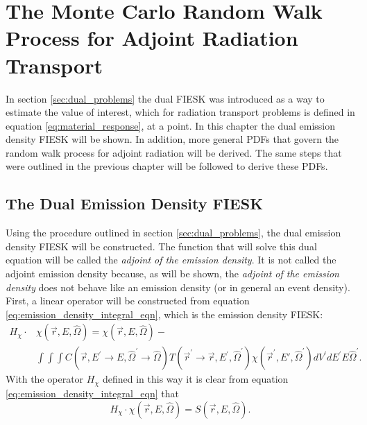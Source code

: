 \chapter{The Monte Carlo Random Walk Process for Adjoint Radiation Transport}
\label{ch:adjoint_particle_transport}
In section \ref{sec:dual_problems} the dual FIESK was introduced as a way to
estimate the value of interest, which for radiation transport problems is
defined in equation \ref{eq:material_response}, at a point. In this chapter the 
dual emission density FIESK will be shown. In addition, more general PDFs that 
govern the random walk process for adjoint radiation will be derived. The same 
steps that were outlined in the previous chapter will be followed to derive 
these PDFs.  

\section{The Dual Emission Density FIESK}
Using the procedure outlined in section \ref{sec:dual_problems}, the dual 
emission density FIESK will be constructed. The function that will solve this 
dual equation will be called the \textit{adjoint of the emission density}. It 
is not called the adjoint emission density because, as will be shown, the
\textit{adjoint of the emission density} does not behave like an emission 
density (or in general an event density). First, a linear operator will be 
constructed from equation \ref{eq:emission_density_integral_eqn}, which is the 
emission density FIESK:
\begin{equation}
  \begin{split}
    H_{\chi} \cdot &\chi(\vec{r},E,\hat{\Omega}) = 
    \chi(\vec{r},E,\hat{\Omega}) - \\
    & \int\int\int C(\vec{r},E^{'} \to E,\hat{\Omega}^{'} \to \hat{\Omega})
    T(\vec{r}^{'} \to \vec{r},E^{'},\hat{\Omega}^{'}) 
    \chi(\vec{r}^{'},E',\hat{\Omega}^{'}) dV^{'}dE^{'}E\hat{\Omega}^{'}.
  \end{split}
\end{equation}
With the operator $H_{\chi}$ defined in this way it is clear from equation
\ref{eq:emission_density_integral_eqn} that 
\begin{equation}
H_{\chi} \cdot \chi(\vec{r},E,\hat{\Omega}) = S(\vec{r},E,\hat{\Omega}).
\end{equation}

